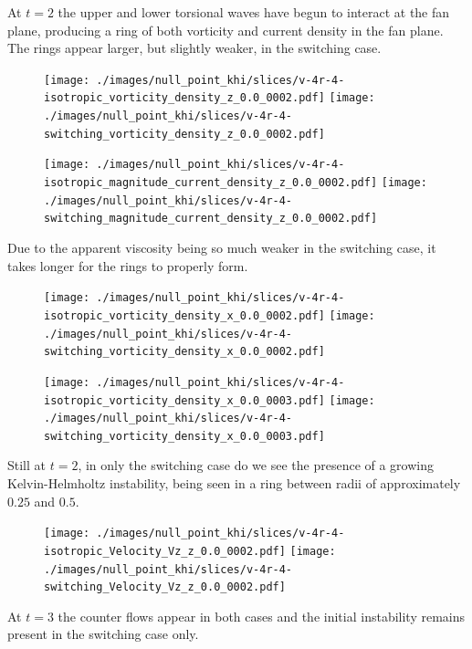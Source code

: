 At $t=2$ the upper and lower torsional waves have begun to interact at the fan plane, producing a ring of both vorticity and current density in the fan plane. The rings appear larger, but slightly weaker, in the switching case. 

\begin{figure}[H]
  \centering
  \texttt{[image: ./images/null\_point\_khi/slices/v-4r-4-isotropic\_vorticity\_density\_z\_0.0\_0002.pdf]}
  \texttt{[image: ./images/null\_point\_khi/slices/v-4r-4-switching\_vorticity\_density\_z\_0.0\_0002.pdf]}
\end{figure}

\begin{figure}[H]
  \centering
  \texttt{[image: ./images/null\_point\_khi/slices/v-4r-4-isotropic\_magnitude\_current\_density\_z\_0.0\_0002.pdf]}
  \texttt{[image: ./images/null\_point\_khi/slices/v-4r-4-switching\_magnitude\_current\_density\_z\_0.0\_0002.pdf]}
\end{figure}

Due to the apparent viscosity being so much weaker in the switching case, it takes longer for the rings to properly form. 

\begin{figure}[H]
  \centering
  \texttt{[image: ./images/null\_point\_khi/slices/v-4r-4-isotropic\_vorticity\_density\_x\_0.0\_0002.pdf]}
  \texttt{[image: ./images/null\_point\_khi/slices/v-4r-4-switching\_vorticity\_density\_x\_0.0\_0002.pdf]}
\end{figure}

\begin{figure}[H]
  \centering
  \texttt{[image: ./images/null\_point\_khi/slices/v-4r-4-isotropic\_vorticity\_density\_x\_0.0\_0003.pdf]}
  \texttt{[image: ./images/null\_point\_khi/slices/v-4r-4-switching\_vorticity\_density\_x\_0.0\_0003.pdf]}
\end{figure}

Still at $t=2$, in only the switching case do we see the presence of a growing Kelvin-Helmholtz instability, being seen in a ring between radii of approximately $0.25$ and $0.5$.

\begin{figure}[H]
  \centering
  \texttt{[image: ./images/null\_point\_khi/slices/v-4r-4-isotropic\_Velocity\_Vz\_z\_0.0\_0002.pdf]}
  \texttt{[image: ./images/null\_point\_khi/slices/v-4r-4-switching\_Velocity\_Vz\_z\_0.0\_0002.pdf]}
\end{figure}

At $t=3$ the counter flows appear in both cases and the initial instability remains present in the switching case only.

